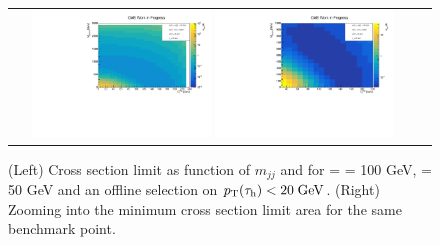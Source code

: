 \begin{figure}[tbh!]
	\centering
	\begin{tabular}{cc}
		\includegraphics[width=0.45\textwidth]{analysis/pics/JetInvMass_vs_MET_xsec_chi100_lsp050_taupt20.pdf}
		\includegraphics[width=0.45\textwidth]{analysis/pics/JetInvMass_vs_MET_xsec_chi100_lsp050_taupt20_zoom.pdf}
	\end{tabular}
	\caption{(Left) Cross section limit as function of $m_{jj}$ and \met for \charginopm = \neutralinotwo = 100 GeV, \neutralinoone = 50 GeV and an offline selection on $p_{\text{T}}(\tau_{\text{h}}) <  20\;\text{Ge}\kern-0.06667em\text{V}$. (Right) Zooming into the minimum cross section limit area for the same benchmark point.}
	\label{fig::JetInvMass_vs_MET_xsec_chi100_lsp050_taupt20}
\end{figure}

